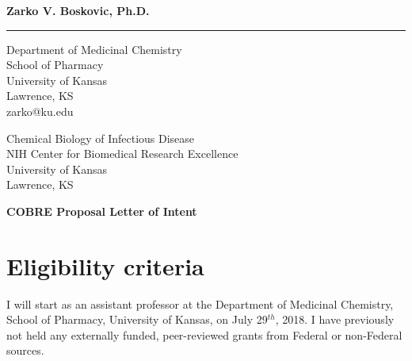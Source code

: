 \documentclass{letter}
\begin{document}
\begin{letter}{}

\begin{minipage}{\textwidth}
    \vspace{-1cm}
    \begin{flushleft}
    {\large\bf Zarko V. Boskovic, Ph.D.}
    \end{flushleft}
    \medskip\hrule height 1pt
    \begin{flushright}
    \hfill Department of Medicinal Chemistry \\
    \hfill School of Pharmacy\\
    \hfill University of Kansas\\
    \hfill Lawrence, KS\\
    \hfill zarko@ku.edu\\
    \end{flushright}
\end{minipage}

{Chemical Biology of Infectious Disease\\
NIH Center for Biomedical Research Excellence\\
University of Kansas\\
Lawrence, KS}
\begin{center}
\textbf{COBRE Proposal Letter of Intent}\\
\end{center}
\opening{}
\section{Eligibility criteria}
I will start as an assistant professor at the Department of Medicinal Chemistry, School of Pharmacy, University of Kansas, on July 29$^{th}$, 2018. I have previously not held any externally funded, peer-reviewed grants from Federal or non-Federal sources.

\end{letter}
\end{document}

